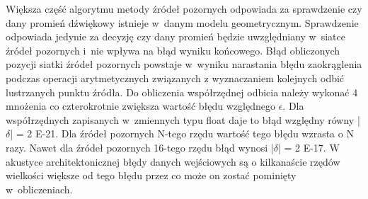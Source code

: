 Większa część algorytmu metody źródeł pozornych odpowiada za sprawdzenie czy dany promień dźwiękowy istnieje w~danym modelu geometrycznym. Sprawdzenie odpowiada jedynie za decyzję czy dany promień będzie uwzględniany w~siatce źródeł pozornych i~nie wpływa na błąd wyniku końcowego. Błąd obliczonych pozycji siatki źródeł pozornych powstaje w~wyniku narastania błędu zaokrąglenia podczas operacji arytmetycznych związanych z wyznaczaniem kolejnych odbić lustrzanych punktu źródła. Do obliczenia współrzędnej odbicia należy wykonać 4 mnożenia co czterokrotnie zwiększa wartość błędu względnego $\epsilon$. Dla współrzędnych zapisanych w~zmiennych typu float daje to błąd względny równy |$\delta$| = 2 E-21. Dla źródeł pozornych N-tego rzędu wartość tego błędu wzrasta o N razy. Nawet dla źródeł pozornych 16-tego rzędu błąd wynosi |$\delta$| = 2 E-17. W akustyce architektonicznej błędy danych wejściowych są o kilkanaście rzędów wielkości większe od tego błędu przez co może on zostać pominięty w~obliczeniach.\\








